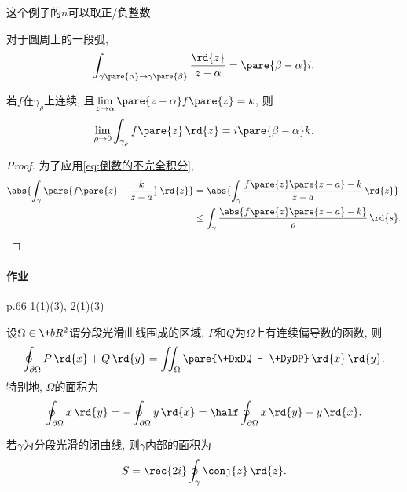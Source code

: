 \documentclass{ctexart}
\begin{document}
\begin{remark}
    这个例子的$n$可以取正/负整数.
\end{remark}
\begin{remark}
    对于圆周上的一段弧,
    \begin{equation}
        \label{eq:倒数的不完全积分}
        \int_{\gamma\pare{\alpha}\rightarrow\gamma\pare{\beta}} \frac{\rd{z}}{z-\alpha} = \pare{\beta - \alpha} i. 
    \end{equation}
\end{remark}
\begin{sample}
    \begin{ex}
        若$f$在$\gamma_\rho$上连续, 且$\displaystyle \lim_{z\rightarrow \alpha} \pare{z-\alpha}f\pare{z} = k$, 则
        \[ \lim_{\rho\rightarrow 0} \int_{\gamma_\rho} f\pare{z}\,\rd{z} = i\pare{\beta - \alpha} k. \]
    \end{ex}
    \begin{proof}
        为了应用\eqref{eq:倒数的不完全积分},
        \begin{align*}
            \abs{\int_\gamma \pare{f\pare{z} - \frac{k}{z-a}}\,\rd{z}} &= \abs{\int_\gamma \frac{f\pare{z}\pare{z-a} - k}{z-a}\,\rd{z}} \\
            &\le \int_\gamma \frac{\abs{f\pare{z}\pare{z-a} - k}}{\rho}\,\rd{s}. \qedhere
        \end{align*}
    \end{proof}
\end{sample}



\paragraph{作业} %
\label{par:作业}

p.66 1(1)(3), 2(1)(3)


\begin{theorem}[Green公式]
    设$\Omega\in \+bR^2$谓分段光滑曲线围成的区域, $P$和$Q$为$\Omega$上有连续偏导数的函数, 则
    \[ \oint_{\partial \Omega} P\,\rd{x} + Q\,\rd{y} = \iint_\Omega \pare{\+DxDQ - \+DyDP}\,\rd{x}\,\rd{y}. \]
    特别地, $\Omega$的面积为
    \[ \oint_{\partial\Omega} x\,\rd{y} = -\oint_{\partial\Omega}y\,\rd{x} = \half \oint_{\partial \Omega} x\,\rd{y} - y\,\rd{x}. \]
\end{theorem}
\begin{corollary}
    若$\gamma$为分段光滑的闭曲线, 则$\gamma$内部的面积为
    \[ S = \rec{2i}\oint_\gamma\conj{z}\,\rd{z}. \]
\end{corollary}
\end{document}
